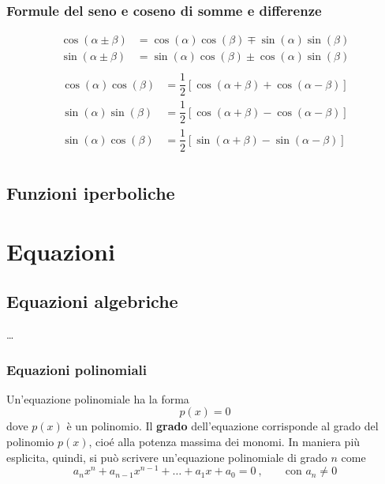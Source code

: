 \subsection{Formule del seno e coseno di somme e differenze}
\begin{equation}
\begin{aligned}
    \cos(\alpha \pm \beta) & = \cos(\alpha) \cos(\beta) \mp \sin(\alpha) \sin(\beta) \\
    \sin(\alpha \pm \beta) & = \sin(\alpha) \cos(\beta) \pm \cos(\alpha) \sin(\beta) \\
\end{aligned}
\end{equation}
\begin{equation}
\begin{aligned}
    \cos(\alpha) \cos(\beta) & = \dfrac{1}{2} \left[ \cos(\alpha + \beta) + \cos(\alpha-\beta) \right] \\
    \sin(\alpha) \sin(\beta) & = \dfrac{1}{2} \left[ \cos(\alpha + \beta) - \cos(\alpha-\beta) \right] \\
    \sin(\alpha) \cos(\beta) & = \dfrac{1}{2} \left[ \sin(\alpha + \beta) - \sin(\alpha-\beta) \right] \\
\end{aligned}
\end{equation}

\section{Funzioni iperboliche}


\chapter{Equazioni}
\section{Equazioni algebriche}
\begin{definition} \dots
\end{definition}

\subsection{Equazioni polinomiali}
\begin{definition} Un'equazione polinomiale ha la forma
    \begin{equation} p(x) = 0 \end{equation}
dove $p(x)$ è un polinomio.
Il \textbf{grado} dell'equazione corrisponde al grado del polinomio $p(x)$, cioé alla potenza massima dei monomi. In maniera più esplicita, quindi, si può scrivere un'equazione polinomiale di grado $n$ come
    \begin{equation}
        a_n x^n + a_{n-1} x^{n-1} + \dots + a_1 x + a_0 = 0 \ , \qquad \text{con $a_n \ne 0$}
    \end{equation}
\end{definition}

